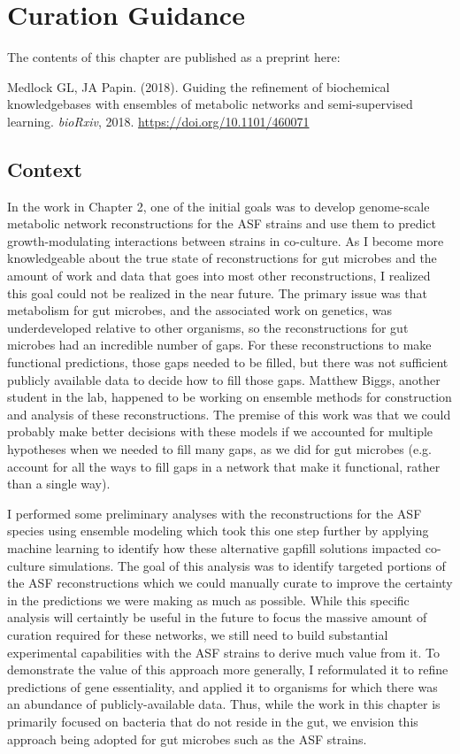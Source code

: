 \documentclass[11pt,twocolumn,notitlepage,openany,twoside]{book}
\begin{document}
\chapter{Curation Guidance}
\begin{refsection}

The contents of this chapter are published as a preprint here:

\medskip\noindent
Medlock GL, JA Papin. (2018). Guiding the refinement of biochemical knowledgebases with ensembles of metabolic networks and semi-supervised learning. \textit{bioRxiv}, 2018. \url{https://doi.org/10.1101/460071}


\section{Context}

In the work in Chapter 2, one of the initial goals was to develop genome-scale metabolic network reconstructions for the ASF strains and use them to predict growth-modulating interactions between strains in co-culture. As I become more knowledgeable about the true state of reconstructions for gut microbes and the amount of work and data that goes into most other reconstructions, I realized this goal could not be realized in the near future. The primary issue was that metabolism for gut microbes, and the associated work on genetics, was underdeveloped relative to other organisms, so the reconstructions for gut microbes had an incredible number of gaps. For these reconstructions to make functional predictions, those gaps needed to be filled, but there was not sufficient publicly available data to decide how to fill those gaps. Matthew Biggs, another student in the lab, happened to be working on ensemble methods for construction and analysis of these reconstructions. The premise of this work was that we could probably make better decisions with these models if we accounted for multiple hypotheses when we needed to fill many gaps, as we did for gut microbes (e.g. account for all the ways to fill gaps in a network that make it functional, rather than a single way).

I performed some preliminary analyses with the reconstructions for the ASF species using ensemble modeling which took this one step further by applying machine learning to identify how these alternative gapfill solutions impacted co-culture simulations. The goal of this analysis was to identify targeted portions of the ASF reconstructions which we could manually curate to improve the certainty in the predictions we were making as much as possible. While this specific analysis will certaintly be useful in the future to focus the massive amount of curation required for these networks, we still need to build substantial experimental capabilities with the ASF strains to derive much value from it. To demonstrate the value of this approach more generally, I reformulated it to refine predictions of gene essentiality, and applied it to organisms for which there was an abundance of publicly-available data. Thus, while the work in this chapter is primarily focused on bacteria that do not reside in the gut, we envision this approach being adopted for gut microbes such as the ASF strains.


\end{refsection}
\end{document}
